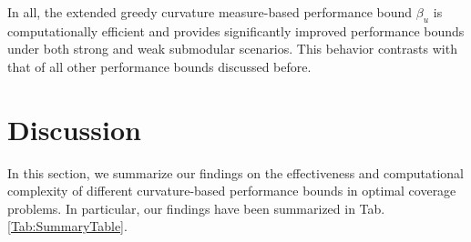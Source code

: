 \documentclass[letterpaper, 10 pt, conference]{ieeeconf}
\newcommand{\N}{\mathbb{N}}
\newcommand{\tsup}[1]{\textsuperscript{#1}}
\begin{document}
In all, the extended greedy curvature measure-based performance bound $\beta_u$ is computationally efficient and provides significantly improved performance bounds under both strong and weak submodular scenarios. This behavior contrasts with that of all other performance bounds discussed before. 



\section{Discussion}\label{Sec:Discussion}


In this section, we summarize our findings on the effectiveness and computational complexity of different curvature-based performance bounds in optimal coverage problems. In particular, our findings have been summarized in Tab. \ref{Tab:SummaryTable}. 




\end{document}
